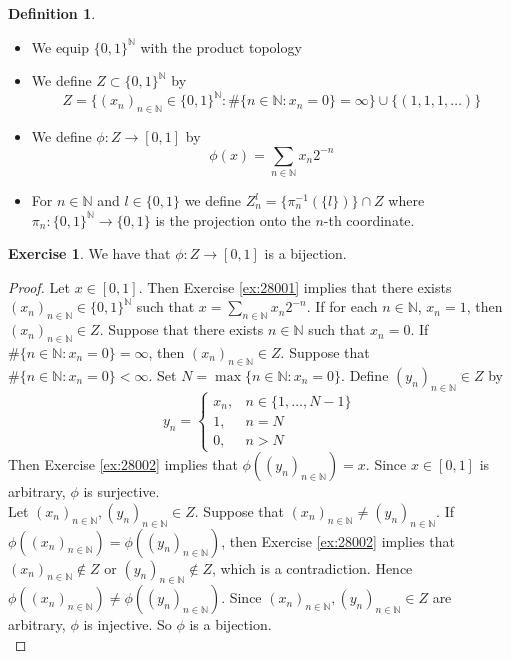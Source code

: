 \documentclass{book}
\theoremstyle{definition}
\newtheorem{defn}[definition]{Definition}
\newtheorem{ex}[definition]{Exercise}
\newcommand{\N}{\mathbb{N}}
\newcommand{\lex}[1]{\label{ex:#1}}
\newcommand{\rex}[1]{Exercise \ref{ex:#1}}
\DeclareMathOperator*{\0}{\mbf{0}}
\DeclareMathOperator*{\1}{\mbf{1}}
\begin{document}
	\begin{defn} \lex{28003} \
		\begin{itemize}
			\item We equip $\{0,1\}^{\N}$ with the product topology 
			\item We define $Z \subset \{0,1\}^{\N}$ by 
			$$Z = \bigg \{(x_n)_{n \in \N} \in \{0,1\}^{\N}: \# \{n \in \N: x_n = 0\} = \infty  \bigg \} \cup \{(1, 1, 1, \ldots)\}$$ 
			\item We define $\phi: Z \rightarrow [0,1]$ by 
			$$\phi(x) = \sum\limits_{n \in \N} x_n2^{-n}$$
			\item For $n \in \N$ and $l \in \{0,1\}$ we define $Z_n^l = \{\pi_n^{-1}(\{l\})\} \cap Z$ where $\pi_n: \{0,1 \}^{\N} \rightarrow \{0,1\}$ is the projection onto the $n$-th coordinate.
		\end{itemize}
	\end{defn}
	
	\begin{ex}
		We have that $\phi:Z \rightarrow [0,1]$ is a bijection.
	\end{ex}
	
	\begin{proof}
		Let $x \in [0,1]$. Then \rex{28001} implies that there exists $(x_n)_{n \in \N} \in \{0,1\}^{\N}$ such that $x = \sum\limits_{n \in \N} x_n2^{-n}$. If for each $n \in \N$, $x_n = 1$, then $(x_n)_{n \in \N} \in Z$. Suppose that there exists $n \in \N$ such that $x_n = 0$. If $\# \{n \in \N: x_n = 0\} = \infty$, then $(x_n)_{n \in \N} \in Z$. Suppose that $ \# \{n \in \N: x_n = 0\} < \infty$. Set $N = \max \{ n \in \N: x_n = 0\}$. Define $(y_n)_{n \in \N} \in Z$ by 
		\[
		y_n = 
		\begin{cases}
			x_n, & n \in \{1, \ldots, N-1\} \\
			1, & n = N \\
			0, & n > N
		\end{cases}
		\]
		Then \rex{28002} implies that $\phi((y_n)_{n \in \N}) = x$. Since $x \in [0,1]$ is arbitrary, $\phi$ is surjective. \vspace{.2cm}\\  Let $(x_n)_{n \in \N}, (y_n)_{n \in \N} \in Z$. Suppose that $(x_n)_{n \in \N} \neq (y_n)_{n \in \N}$. If  $\phi((x_n)_{n \in \N}) = \phi((y_n)_{n \in \N})$, then \rex{28002} implies that $(x_n)_{n \in \N} \not \in Z$ or $(y_n)_{n \in \N} \not \in Z$, which is a contradiction. Hence $\phi((x_n)_{n \in \N}) \neq \phi((y_n)_{n \in \N})$. Since $(x_n)_{n \in \N}, (y_n)_{n \in \N} \in Z$ are arbitrary, $\phi$ is injective. So $\phi$ is a bijection. \\
	\end{proof}
	
\end{document}
